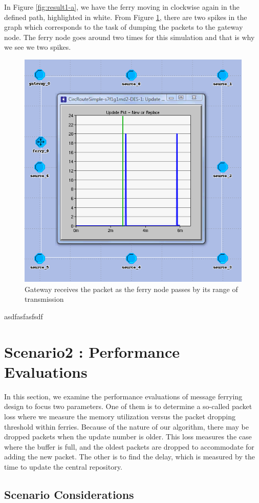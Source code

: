 In Figure \ref{fig:result1-a}, we have the ferry moving in clockwise again in the defined path, highlighted in white.  
From Figure \ref{fig:result1-b}, there are two spikes in the graph which corresponds to the task of dumping the packets to the gateway node.  
The ferry node goes around two times for this simulation and that is why we see we two spikes.  

\begin{figure}[h]
    \centering
    \includegraphics[width=.5\textwidth]{images/scenario1-result-gateway}
    \caption{Gateway receives the packet as the ferry node passes by its range of transmission}
    \label{fig:result1-b}
\end{figure}

asdfasfasfsdf

\section{Scenario2 : Performance Evaluations}
\label{sec:scenario2}

In this section, we examine the performance evaluations of message ferrying design to focus two parameters.  
One of them is to determine a so-called packet loss where we measure the memory utilization versus the packet dropping threshold within ferries.
Because of the nature of our algorithm, there may be dropped packets when the update number is older.
This loss measures the case where the buffer is full, and the oldest packets are dropped to accommodate for adding the new packet.  
The other is to find the delay, which is measured by the time to update the central repository.

\subsection{Scenario Considerations}

